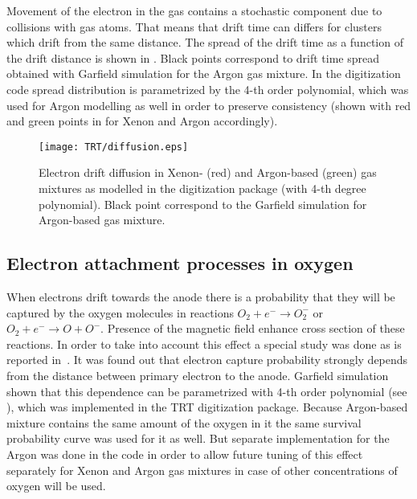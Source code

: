 
Movement of the electron in the gas contains a stochastic component due to collisions with gas atoms. 
That means that drift time can differs for clusters which drift from the same distance.
The spread of the drift time as a function of the drift distance is shown in .
Black points correspond to drift time spread obtained with Garfield simulation for the Argon gas mixture.
In the digitization code spread distribution is parametrized by the 4-th order polynomial, which was used for Argon modelling as well
in order to preserve consistency (shown with red and green points in  for Xenon and Argon accordingly).

\begin{figure}
\begin{center}
\texttt{[image: TRT/diffusion.eps]}
\caption{Electron drift diffusion in Xenon- (red) and Argon-based (green) gas mixtures as modelled in the digitization package (with 4-th degree polynomial). 
Black point correspond to the Garfield simulation for Argon-based gas mixture.}
\label{fig:diffusion}
\end{center}
\end{figure}


\subsection{Electron attachment processes in oxygen}
\label{subsec:recapture}
When electrons drift towards the anode there is a probability that they will be captured by the oxygen molecules in reactions
$O_2 + e^- \to O_2^-$ or $O_2 + e^- \to O + O^-$. Presence of the magnetic field enhance cross section of these reactions.
In order to take into account this effect a special study was done as is reported in~\cite{esben_thesis}.
It was found out that electron capture probability strongly depends from the distance between primary electron to the anode.
Garfield simulation shown that this dependence can be parametrized with 4-th order polynomial (see ), 
which was implemented in the TRT digitization package. 
Because Argon-based mixture contains the same amount of the oxygen in it the same survival probability
curve was used for it as well. But separate implementation for the Argon was done in the code in order to allow future tuning of this effect separately for Xenon and Argon gas mixtures
in case of other concentrations of oxygen will be used.

